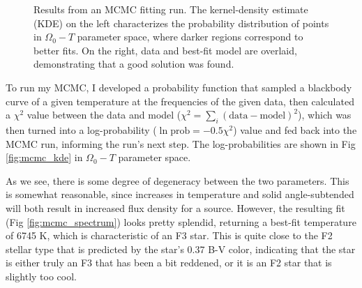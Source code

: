 \documentclass[12pt]{article}
\newenvironment{answer}[2][Answer]{\begin{trivlist}
\item[\hskip \labelsep {\bfseries #1}\hskip \labelsep {\bfseries #2.}]}{\end{trivlist}}
\begin{document}
\begin{answer}{2}
  \begin{figure}[htp]
    \hspace*{\fill}%
    \hfill%
    \hfill%
    \hspace*{\fill}%
    \caption{Results from an MCMC fitting run. The kernel-density estimate (KDE) on the left characterizes the probability distribution of points in $\Omega_0-T$ parameter space, where darker regions correspond to better fits. On the right, data and best-fit model are overlaid, demonstrating that a good solution was found.}
  \end{figure}


  To run my MCMC, I developed a probability function that sampled a blackbody curve of a given temperature at the frequencies of the given data, then calculated a $\chi^2$ value between the data and model ($\chi^2 = \sum_i (\text{data} - \text{model})^2$), which was then turned into a log-probability ($\ln \text{prob} = -0.5 \chi^2$) value and fed back into the MCMC run, informing the run's next step. The log-probabilities are shown in Fig \ref{fig:mcmc_kde} in $\Omega_0-T$ parameter space.

  As we see, there is some degree of degeneracy between the two parameters. This is somewhat reasonable, since increases in temperature and solid angle-subtended will both result in increased flux density for a source. However, the resulting fit (Fig \ref{fig:mcmc_spectrum}) looks pretty splendid, returning a best-fit temperature of 6745 K, which is characteristic of an F3 star. This is quite close to the F2 stellar type that is predicted by the star's 0.37 B-V color, indicating that the star is either truly an F3 that has been a bit reddened, or it is an F2 star that is slightly too cool.
\end{answer}
\end{document}
